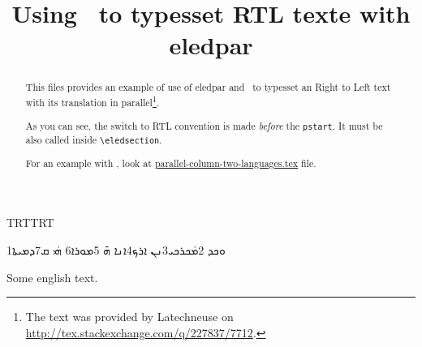 \documentclass{article}
\newcommand{\textsyriac}[1] %
           {\bgroup\luatextextdir TRT\syriacfont #1\egroup}
\newenvironment{syriac}     %
           {\luatextextdir TRT\luatexpardir TRT\syriacfont}{}
\begin{document}
\date{}
\title{Using \LuaLaTeX\ to typesset RTL texte with eledpar}
\maketitle
\begin{abstract}
This files provides an example of use of eledpar and \LuaLaTeX\ to typesset an Right to Left text with its translation in parallel\footnote{The text was provided by Latechneuse on \url{http://tex.stackexchange.com/q/227837/7712}.}.  

As you can see, the switch to RTL convention is made \emph{before} the \verb+pstart+.
It must be also called inside \verb+\eledsection+.

For an example with \XeLaTeX, look at \href{./parallel-column-two-languages.tex}{parallel-column-two-languages.tex} file.
\end{abstract}
\begin{pages}
\begin{Leftside}
\begin{syriac}
\beginnumbering
   \pstart 
       \eledsection*{\textsyriac{ܡܿܟܪܟܝ}}
   \pend

   \pstart
        1ܘܟܕ 2ܡܿܟܪܟܝ3ܢܢ ܐܪܟ4ܐܢܐ ܗ̄ 5ܡܘܪܐ6 ܗܿܝ ܩ7ܕܡܝܬܐ
   \pend
\endnumbering
\end{syriac}
\end{Leftside}

\begin{Rightside}
\beginnumbering
   \pstart
   \pend

   \pstart
        Some english text. 
   \pend
\endnumbering
\end{Rightside}

\Pages
\end{pages} 
\end{document}
